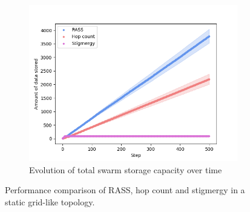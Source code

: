 \documentclass[letterpaper, 10 pt, conference]{ieeeconf}
\begin{document}
\begin{figure}
\begin{subfigure}{0.30\textwidth}
        \includegraphics[width=\textwidth]{figures/grid_storage.png}
        \caption{Evolution of total swarm storage capacity over time}
        \label{results:grid_100_storage}
    \end{subfigure}
    \caption{Performance comparison of RASS, hop count and stigmergy in a static grid-like topology.}
    \label{results:staticTopology}
    \vspace{-2mm}
\end{figure}
\end{document}
